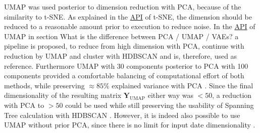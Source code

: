 \gls{UMAP} was used posterior to dimension reduction with \gls{PCA}, because of the similarity to \gls{t-SNE}. As explained in the \href{https://scikit-learn.org/stable/modules/generated/sklearn.manifold.TSNE.html}{API} of \gls{t-SNE}, the dimension should be reduced to a reasonable amount prior to execution to reduce noise. In the \href{https://umap-learn.readthedocs.io/en/latest/api.html}{API} of \gls{UMAP} in section \glqq What is the difference between PCA / UMAP / VAEs?\grqq{} a pipeline is proposed, to reduce from high dimension with \gls{PCA}, continue with reduction by \gls{UMAP} and cluster with \gls{HDBSCAN} and is, therefore, used as reference. Furthermore \gls{UMAP} with 30 components posterior to \gls{PCA} with 100 components provided a comfortable balancing of computational effort of both methods, while preserving $\approx 85\%$ explained variance with \gls{PCA} \autocite{mcinnes_umap_2020}. Since the final dimensionality of the resulting matrix $\mathbf{Y}_{\text{UMAP}}$ either way was $<50$, a reduction with \gls{PCA} to $>50$ could be used while still preserving the usability of Spanning Tree calculation with \gls{HDBSCAN} \autocite{mcinnes_hdbscan_2017}. However, it is indeed also possible to use \gls{UMAP} without prior \gls{PCA}, since there is no limit for input date dimensionality \autocite{mcinnes_umap_2020}. 